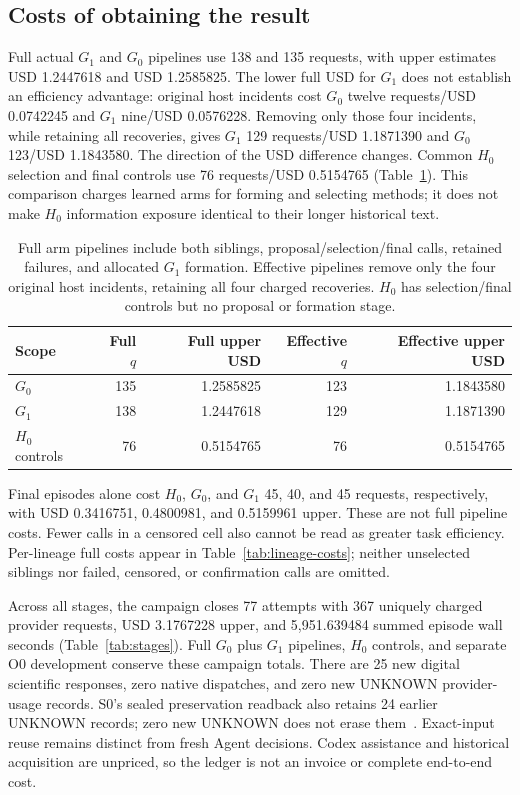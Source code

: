 \subsection{Costs of obtaining the result}

Full actual $G_1$ and $G_0$ pipelines use 138 and 135 requests, with upper
estimates USD 1.2447618 and USD 1.2585825. The lower full USD for $G_1$ does
not establish an efficiency advantage: original host incidents cost $G_0$
twelve requests/USD 0.0742245 and $G_1$ nine/USD 0.0576228. Removing only those
four incidents, while retaining all recoveries, gives $G_1$ 129 requests/USD
1.1871390 and $G_0$ 123/USD 1.1843580. The direction of the USD difference
changes. Common $H_0$ selection and final controls use 76 requests/USD
0.5154765 (Table~\ref{tab:costs}). This comparison charges learned arms for
forming and selecting methods; it does not make $H_0$ information exposure
identical to their longer historical text.

\begin{table}[htbp]
\centering
\footnotesize
\begin{tabular}{lrrrr}
\toprule
Scope & Full $q$ & Full upper USD & Effective $q$ & Effective upper USD \\
\midrule
$G_0$ & 135 & 1.2585825 & 123 & 1.1843580 \\
$G_1$ & 138 & 1.2447618 & 129 & 1.1871390 \\
$H_0$ controls & 76 & 0.5154765 & 76 & 0.5154765 \\
\bottomrule
\end{tabular}
\caption{Full arm pipelines include both siblings, proposal/selection/final calls, retained failures, and allocated $G_1$ formation. Effective pipelines remove only the four original host incidents, retaining all four charged recoveries. $H_0$ has selection/final controls but no proposal or formation stage.}
\label{tab:costs}
\end{table}

Final episodes alone cost $H_0$, $G_0$, and $G_1$ 45, 40, and 45 requests,
respectively, with USD 0.3416751, 0.4800981, and 0.5159961 upper. These are
not full pipeline costs. Fewer calls in a censored cell also cannot be read
as greater task efficiency. Per-lineage full costs appear in
Table~\ref{tab:lineage-costs}; neither unselected siblings nor failed,
censored, or confirmation calls are omitted.

Across all stages, the campaign closes 77 attempts with 367 uniquely charged
provider requests, USD 3.1767228 upper, and 5,951.639484 summed episode wall
seconds (Table~\ref{tab:stages}). Full $G_0$ plus $G_1$ pipelines, $H_0$
controls, and separate O0 development conserve these campaign totals.
There are 25 new digital scientific responses, zero native dispatches, and
zero new UNKNOWN provider-usage records. S0's sealed preservation readback
also retains 24 earlier UNKNOWN records; zero new UNKNOWN does not erase
them~\cite{preservation}. Exact-input reuse remains distinct from fresh Agent
decisions. Codex assistance and historical acquisition are unpriced, so the
ledger is not an invoice or complete end-to-end cost.

